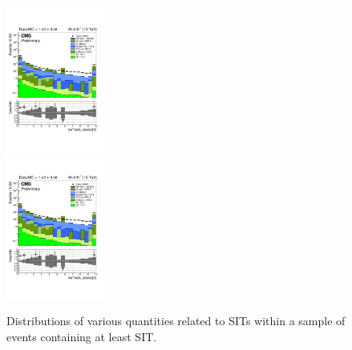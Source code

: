 \begin{figure}[h!]
\begin{center}
    \includegraphics[width=0.3\textwidth,page=9,trim=0 100 50 100,clip]{figures/SITV/SIT/SIT.pdf}\\
    \includegraphics[width=0.3\textwidth,page=3,trim=0 100 50 100,clip]{figures/SITV/SIT/SIT.pdf} 
    \caption{Distributions of various quantities related to SITs
      within a sample of \mj events containing at least SIT.}
    \label{fig:dataMC_SIT_mu}
  \end{center} 
\end{figure}

